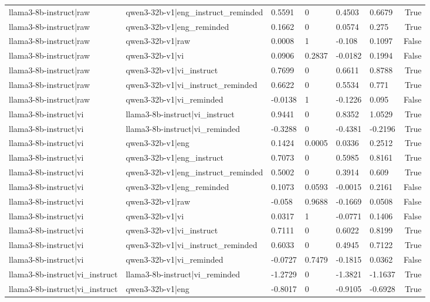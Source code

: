 \begin{table}
\begin{tabular}{llllllr}
llama3-8b-instruct|raw & qwen3-32b-v1|eng_instruct_reminded & 0.5591 & 0 & 0.4503 & 0.6679 & True \\
llama3-8b-instruct|raw & qwen3-32b-v1|eng_reminded & 0.1662 & 0 & 0.0574 & 0.275 & True \\
llama3-8b-instruct|raw & qwen3-32b-v1|raw & 0.0008 & 1 & -0.108 & 0.1097 & False \\
llama3-8b-instruct|raw & qwen3-32b-v1|vi & 0.0906 & 0.2837 & -0.0182 & 0.1994 & False \\
llama3-8b-instruct|raw & qwen3-32b-v1|vi_instruct & 0.7699 & 0 & 0.6611 & 0.8788 & True \\
llama3-8b-instruct|raw & qwen3-32b-v1|vi_instruct_reminded & 0.6622 & 0 & 0.5534 & 0.771 & True \\
llama3-8b-instruct|raw & qwen3-32b-v1|vi_reminded & -0.0138 & 1 & -0.1226 & 0.095 & False \\
llama3-8b-instruct|vi & llama3-8b-instruct|vi_instruct & 0.9441 & 0 & 0.8352 & 1.0529 & True \\
llama3-8b-instruct|vi & llama3-8b-instruct|vi_reminded & -0.3288 & 0 & -0.4381 & -0.2196 & True \\
llama3-8b-instruct|vi & qwen3-32b-v1|eng & 0.1424 & 0.0005 & 0.0336 & 0.2512 & True \\
llama3-8b-instruct|vi & qwen3-32b-v1|eng_instruct & 0.7073 & 0 & 0.5985 & 0.8161 & True \\
llama3-8b-instruct|vi & qwen3-32b-v1|eng_instruct_reminded & 0.5002 & 0 & 0.3914 & 0.609 & True \\
llama3-8b-instruct|vi & qwen3-32b-v1|eng_reminded & 0.1073 & 0.0593 & -0.0015 & 0.2161 & False \\
llama3-8b-instruct|vi & qwen3-32b-v1|raw & -0.058 & 0.9688 & -0.1669 & 0.0508 & False \\
llama3-8b-instruct|vi & qwen3-32b-v1|vi & 0.0317 & 1 & -0.0771 & 0.1406 & False \\
llama3-8b-instruct|vi & qwen3-32b-v1|vi_instruct & 0.7111 & 0 & 0.6022 & 0.8199 & True \\
llama3-8b-instruct|vi & qwen3-32b-v1|vi_instruct_reminded & 0.6033 & 0 & 0.4945 & 0.7122 & True \\
llama3-8b-instruct|vi & qwen3-32b-v1|vi_reminded & -0.0727 & 0.7479 & -0.1815 & 0.0362 & False \\
llama3-8b-instruct|vi_instruct & llama3-8b-instruct|vi_reminded & -1.2729 & 0 & -1.3821 & -1.1637 & True \\
llama3-8b-instruct|vi_instruct & qwen3-32b-v1|eng & -0.8017 & 0 & -0.9105 & -0.6928 & True \\

\end{tabular}
\end{table}
